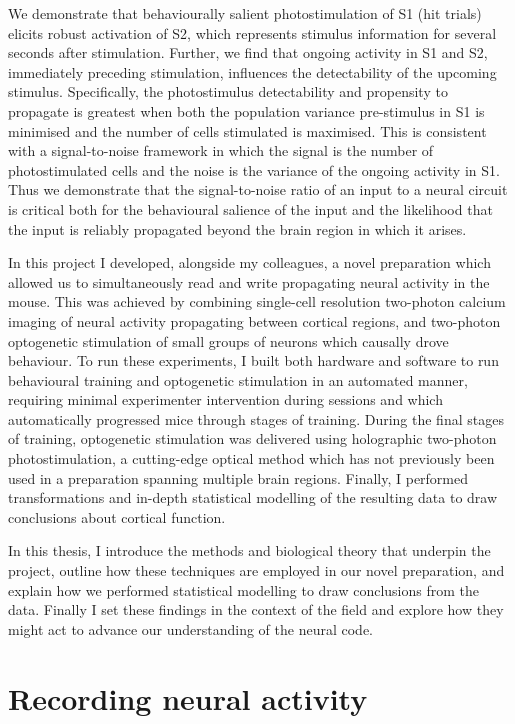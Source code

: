 We demonstrate that behaviourally salient photostimulation of S1 (hit trials) elicits robust activation of S2, which represents stimulus information for several seconds after stimulation. Further, we find that ongoing activity in S1 and S2, immediately preceding stimulation, influences the detectability of the upcoming stimulus. Specifically, the photostimulus detectability and propensity to propagate is greatest when both the population variance pre-stimulus in S1 is minimised and the number of cells stimulated is maximised. This is consistent with a signal-to-noise framework in which the signal is the number of photostimulated cells and the noise is the variance of the ongoing activity in S1. Thus we demonstrate that the signal-to-noise ratio of an input to a neural circuit is critical both for the behavioural salience of the input and the likelihood that the input is reliably propagated beyond the brain region in which it arises.

In this project I developed, alongside my colleagues, a novel preparation which allowed us to simultaneously read and write propagating neural activity in the mouse. This was achieved by combining single-cell resolution two-photon calcium imaging of neural activity propagating between cortical regions, and two-photon optogenetic stimulation of small groups of neurons which causally drove behaviour. To run these experiments, I built both hardware and software to run behavioural training and optogenetic stimulation in an automated manner, requiring minimal experimenter intervention during sessions and which automatically progressed mice through stages of training. During the final stages of training, optogenetic stimulation was delivered using holographic two-photon photostimulation, a cutting-edge optical method which has not previously been used in a preparation spanning multiple brain regions. Finally, I performed transformations and in-depth statistical modelling of the resulting data to draw conclusions about cortical function.

In this thesis, I introduce the methods and biological theory that underpin the project, outline how these techniques are employed in our novel preparation, and explain how we performed statistical modelling to draw conclusions from the data. Finally I set these findings in the context of the field and explore how they might act to advance our understanding of the neural code.

\section{Recording neural activity}

